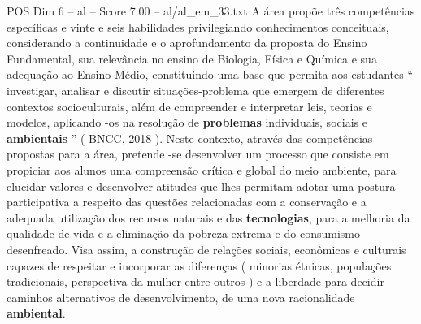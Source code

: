 \begin{textsample}{POS Dim 6 – al – Score 7.00 – al/al\_em\_33.txt}
A área propõe três competências específicas e vinte e seis habilidades privilegiando conhecimentos conceituais, considerando a continuidade e o aprofundamento da proposta do Ensino Fundamental, sua relevância no ensino de Biologia, Física e Química e sua adequação ao Ensino Médio, constituindo uma base que permita aos estudantes “ investigar, analisar e discutir situações-problema que emergem de diferentes contextos socioculturais, além de compreender e interpretar leis, teorias e modelos, aplicando -os na resolução de \textbf{problemas} individuais, sociais e \textbf{ambientais} ” ( BNCC, 2018 ).
Neste contexto, através das competências propostas para a área, pretende -se desenvolver um processo que consiste em propiciar aos alunos uma compreensão crítica e global do meio ambiente, para elucidar valores e desenvolver atitudes que lhes permitam adotar uma postura participativa a respeito das questões relacionadas com a conservação e a adequada utilização dos recursos naturais e das \textbf{tecnologias}, para a melhoria da qualidade de vida e a eliminação da pobreza extrema e do consumismo desenfreado.
Visa assim, a construção de relações sociais, econômicas e culturais capazes de respeitar e incorporar as diferenças ( minorias étnicas, populações tradicionais, perspectiva da mulher entre outros ) e a liberdade para decidir caminhos alternativos de desenvolvimento, de uma nova racionalidade \textbf{ambiental}.

\end{textsample}
